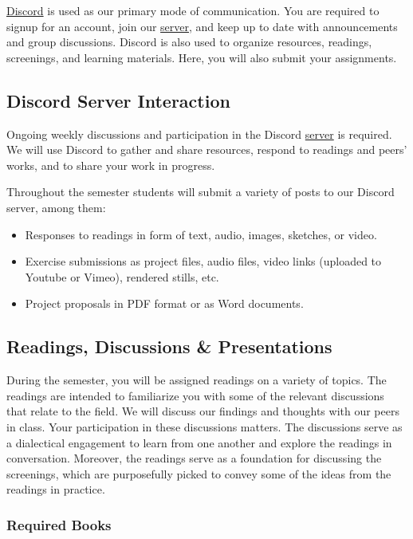 \href{http://discordapp.com/}{Discord} is used as our primary mode of communication. You are required to signup for an account, join our \href{\discordURL}{server}, and keep up to date with announcements and group discussions. Discord is also used to organize resources, readings, screenings, and learning materials. Here, you will also submit your assignments.

\subsection{Discord Server Interaction}
Ongoing weekly discussions and participation in the Discord \href{\discordURL}{server} is required. We will use Discord to gather and share resources, respond to readings and peers' works, and to share your work in progress.

Throughout the semester students will submit a variety of posts to our Discord server, among them:

\begin{itemize}
      \tightlist
      \item Responses to readings in form of text, audio, images, sketches, or video.
      \item Exercise submissions as project files, audio files, video links (uploaded to Youtube or Vimeo), rendered stills, etc.
      \item Project proposals in PDF format or as Word documents.
\end{itemize}

\subsection{Readings, Discussions \& Presentations}

During the semester, you will be assigned readings on a variety of topics. The readings are intended to familiarize you with some of the relevant discussions that relate to the field. We will discuss our findings and thoughts with our peers in class. Your participation in these discussions matters. The discussions serve as a dialectical engagement to learn from one another and explore the readings in conversation. Moreover, the readings serve as a foundation for discussing the screenings, which are purposefully picked to convey some of the ideas from the readings in practice.

\subsubsection{Required Books}


